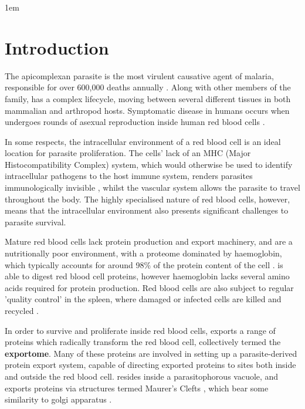\documentclass[fleqn,10pt]{article} %
\begin{document}
\newcommand{\str}
[1]{\textbf{#1}}
\openup 1em

\section{Introduction} 

The apicomplexan parasite  is the most virulent causative agent of malaria, responsible for over 600,000 deaths annually \cite{WorldHealthOrganisation2013}. Along with other members of the  family, \pf has a complex lifecycle, moving between several different tissues in both mammalian and arthropod hosts. Symptomatic disease in humans occurs when \pf undergoes rounds of asexual reproduction inside human red blood cells \cite{Chen2000}.

In some respects, the intracellular environment of a red blood cell is an ideal location for parasite proliferation. The cells' lack of an MHC (Major Histocompatibility Complex) system, which would otherwise be used to identify intracellular pathogens to the host immune system, renders parasites immunologically invisible \cite{Kirchgatter2005}, whilst the vascular system allows the parasite to travel throughout the body. The highly specialised nature of red blood cells, however, means that the intracellular environment also presents significant challenges to parasite survival.

Mature red blood cells lack protein production and export machinery, and are a nutritionally poor environment, with a proteome dominated by haemoglobin, which typically accounts for around 98\% of the protein content of the cell \cite{DAlessandro2010}. \pf is able to digest red blood cell proteins, however haemoglobin lacks several amino acids required for protein production. Red blood cells are also  subject to regular 'quality control' in the spleen, where damaged or infected cells are killed and recycled \cite{Elsworth2014}.

In order to survive and proliferate inside red blood cells, \pf exports a range of proteins which radically transform the red blood cell, collectively termed the \str{exportome}. Many of these proteins are involved in setting up a parasite-derived protein export system, capable of directing exported \pf proteins to sites both inside and outside the red blood cell. \pf resides inside a parasitophorous vacuole, and exports proteins via structures termed Maurer's Clefts \cite{Marti2013}, which bear some similarity to golgi apparatus \cite{Mundwiler-Pachlatko2013}.
\end{document}

